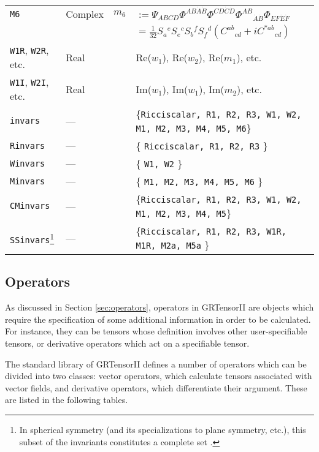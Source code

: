 \documentclass{article}
\begin{document}
{{{\begin{longtable}[c]{llrp{}}
\texttt{M6}	& Complex & $m_6$ & $:=	\Psi_{ABCD} \Phi^{AB\dot{A}\dot{B}}
				  \Phi^{CD\dot{C}\dot{D}}
				  \Phi^{AB}{}_{\dot{A}\dot{B}}
				  \Phi_{EF\dot{E}\dot{F}}$\\
		&	&	& $= \frac{1}{32} S_a{}^e S_e{}^c S_b{}^f
				  S_f{}^d (C^{ab}{}_{cd} + i C^{*ab}{}_{cd})$\\
\texttt{W1R}, \texttt{W2R}, etc. & Real & &
		Re($w_1$), Re($w_2$), Re($m_1$), etc. \\
\texttt{W1I}, \texttt{W2I}, etc. & Real & &
		Im($w_1$), Im($w_1$), Im($m_2$), etc. \\
\texttt{invars}	& ---	& & \{\texttt{Ricciscalar, R1, R2, R3, W1, W2, M1, M2,
			M3, M4, M5, M6}\} \\
\texttt{Rinvars} & ---	& & \{ \texttt{Ricciscalar, R1, R2, R3} \} \\
\texttt{Winvars} & ---	& & \{ \texttt{W1, W2} \} \\
\texttt{Minvars} & ---	& & \{ \texttt{M1, M2, M3, M4, M5, M6} \} \\
\texttt{CMinvars}& ---	& & \{\texttt{Ricciscalar, R1, R2, R3, W1, W2, M1,
			M2, M3, M4, M5}\} \\
\texttt{SSinvars}\footnote{In spherical symmetry (and its specializations to
  plane symmetry, etc.), 
  this subset of the invariants constitutes a complete set
  \cite{musgrave:1996}.}
                 & ---	& & \{\texttt{Ricciscalar, R1, R2, R3, W1R, M1R,
			M2a, M5a} \} \\
\hline
\end{longtable}
\renewcommand{\baselinestretch}{1}\normalsize
%
\subsection{Operators}
%
As discussed in Section \ref{sec:operators}, operators in GRTensorII are
objects which require the specification of some additional information
in order to be calculated. For instance, they can be tensors whose 
definition involves other user-specifiable tensors, or derivative operators
which act on a specifiable tensor.

The standard library of GRTensorII
defines a number of operators which can be divided into two classes: vector
operators, which calculate tensors associated with vector fields, and
derivative operators, which differentiate their argument. These are listed
in the following tables.\\

}}}
\end{document}
